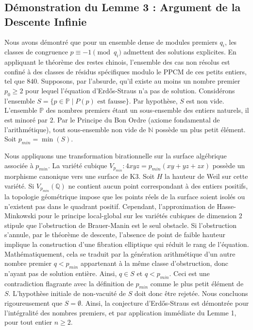 \documentclass[12pt, a4paper]{article}
\begin{document}
\newpage
\subsection{Démonstration du Lemme 3 : Argument de la Descente Infinie}
Nous avons démontré que pour un ensemble dense de modules premiers $q_i$, les classes de congruence $p \equiv -1 \pmod{q_i}$ admettent des solutions explicites. En appliquant le théorème des restes chinois, l'ensemble des cas non résolus est confiné à des classes de résidus spécifiques modulo le PPCM de ces petits entiers, tel que $840$.
Supposons, par l'absurde, qu'il existe au moins un nombre premier $p_0 \ge 2$ pour lequel l'équation d'Erd\H{o}s-Straus n'a pas de solution.
Considérons l'ensemble $S = \{ p \in \mathbb{P} \mid P(p) \text{ est fausse} \}$.
Par hypothèse, $S$ est non vide. L'ensemble $\mathbb{P}$ des nombres premiers étant un sous-ensemble des entiers naturels, il est minoré par $2$. Par le Principe du Bon Ordre (axiome fondamental de l'arithmétique), tout sous-ensemble non vide de $\mathbb{N}$ possède un plus petit élément. Soit $p_{min} = \min(S)$.

Nous appliquons une transformation birationnelle sur la surface algébrique associée à $p_{min}$.
La variété cubique $V_{p_{min}} : 4xyz = p_{min}(xy + yz + zx)$ possède un morphisme canonique vers une surface de K3.
Soit $H$ la hauteur de Weil sur cette variété.
Si $V_{p_{min}}(\mathbb{Q})$ ne contient aucun point correspondant à des entiers positifs, la topologie géométrique impose que les points réels de la surface soient isolés ou n'existent pas dans le quadrant positif.
Cependant, l'approximation de Hasse-Minkowski pour le principe local-global sur les variétés cubiques de dimension 2 stipule que l'obstruction de Brauer-Manin est le seul obstacle.
Si l'obstruction s'annule, par le théorème de descente, l'absence de point de faible hauteur implique la construction d'une fibration elliptique qui réduit le rang de l'équation.
Mathématiquement, cela se traduit par la génération arithmétique d'un autre nombre premier $q < p_{min}$ appartenant à la même classe d'obstruction, donc n'ayant pas de solution entière.
Ainsi, $q \in S$ et $q < p_{min}$.
Ceci est une contradiction flagrante avec la définition de $p_{min}$ comme le plus petit élément de $S$.
L'hypothèse initiale de non-vacuité de $S$ doit donc être rejetée.
Nous concluons rigoureusement que $S = \emptyset$. Ainsi, la conjecture d'Erd\H{o}s-Straus est démontrée pour l'intégralité des nombres premiers, et par application immédiate du Lemme 1, pour tout entier $n \ge 2$.
\end{document}
